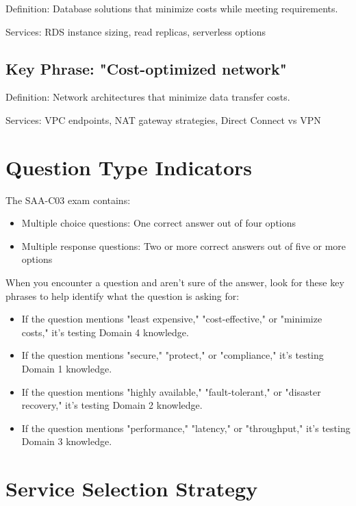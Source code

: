 \documentclass[11pt,a4paper]{report}
\begin{document}
Definition: Database solutions that minimize costs while meeting requirements.

Services: RDS instance sizing, read replicas, serverless options



\section{Key Phrase: "Cost-optimized network"}

Definition: Network architectures that minimize data transfer costs.

Services: VPC endpoints, NAT gateway strategies, Direct Connect vs VPN



\chapter{Question Type Indicators}


The SAA-C03 exam contains:

\begin{itemize}
  \item Multiple choice questions: One correct answer out of four options
  \item Multiple response questions: Two or more correct answers out of five or more options
\end{itemize}

When you encounter a question and aren't sure of the answer, look for these key phrases to help identify what the question is asking for:


\begin{itemize}
  \item If the question mentions "least expensive," "cost-effective," or "minimize costs," it's testing Domain 4 knowledge.
  \item If the question mentions "secure," "protect," or "compliance," it's testing Domain 1 knowledge.
  \item If the question mentions "highly available," "fault-tolerant," or "disaster recovery," it's testing Domain 2 knowledge.
  \item If the question mentions "performance," "latency," or "throughput," it's testing Domain 3 knowledge.
\end{itemize}


\chapter{Service Selection Strategy}
\end{document}
